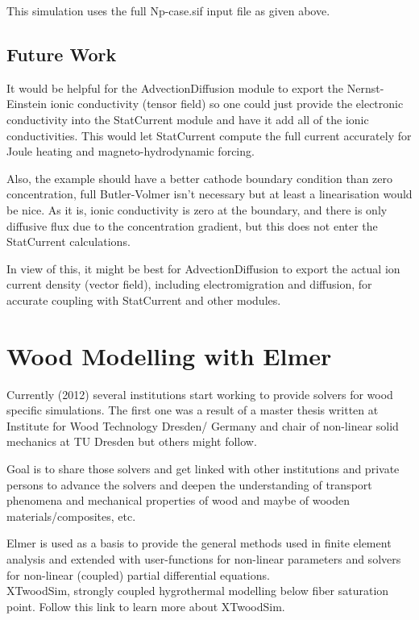 This simulation uses the full Np-case.sif input file as given above.

\subsection{Future Work}

It would be helpful for the AdvectionDiffusion module to export the Nernst-Einstein ionic conductivity (tensor field) so one could just provide the electronic conductivity into the StatCurrent module and have it add all of the ionic conductivities. This would let StatCurrent compute the full current accurately for Joule heating and magneto-hydrodynamic forcing.

Also, the example should have a better cathode boundary condition than zero concentration, full Butler-Volmer isn't necessary but at least a linearisation would be nice. As it is, ionic conductivity is zero at the boundary, and there is only diffusive flux due to the concentration gradient, but this does not enter the StatCurrent calculations.

In view of this, it might be best for AdvectionDiffusion to export the actual ion current density (vector field), including electromigration and diffusion, for accurate coupling with StatCurrent and other modules. 

\section{Wood Modelling with Elmer}

Currently (2012) several institutions start working to provide solvers for wood specific simulations. The first one was a result of a master thesis written at Institute for Wood Technology Dresden/ Germany and chair of non-linear solid mechanics at TU Dresden but others might follow.

Goal is to share those solvers and get linked with other institutions and private persons to advance the solvers and deepen the understanding of transport phenomena and mechanical properties of wood and maybe of wooden materials/composites, etc.

Elmer is used as a basis to provide the general methods used in finite element analysis and extended with user-functions for non-linear parameters and solvers for non-linear (coupled) partial differential equations.\\

\noindent XTwoodSim, strongly coupled hygrothermal modelling below fiber saturation point.  Follow this link to learn more about XTwoodSim.

